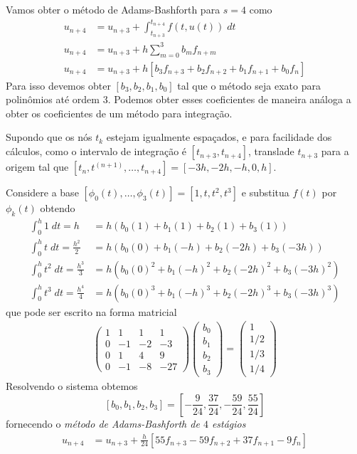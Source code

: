 \begin{ex}
Vamos obter o método de Adams-Bashforth para $s=4$ como
\begin{eqnarray}
  u_{n+4}  &= u_{n+3}  + \int _{t_{n+3}}^{t_{n+4}} f(t,u(t)) \; dt \\
  u_{n+4}  &= u_{n+3}  + h \sum_{m=0}^{3} b_m f_{n+m} \\
  u_{n+4}  &= u_{n+3}  + h [b_3f_{n+3} +b_2f_{n+2} +b_1f_{n+1} +b_0f_n]
\end{eqnarray}
Para isso devemos obter $[b_3,b_2,b_1,b_0]$ tal que o método seja exato para polinômios até ordem $3$. Podemos obter esses coeficientes de maneira análoga a obter os coeficientes de um método para integração.

Supondo que os nós $t_k$ estejam igualmente espaçados, e para facilidade dos cálculos, como o intervalo de integração é $[t_{n+3},t_{n+4}]$, translade $t_{n+3}$ para a origem tal que $[t_n,t^{(n+1)},\ldots ,t_{n+4}]=[-3h,-2h,-h,0,h]$.

Considere a base $[\phi _0(t),\ldots ,\phi _3(t)]=[1, t, t^2, t^3]$ e substitua $f(t)$ por $\phi _k(t)$ obtendo
\begin{eqnarray*}
  \int _0^{h} 1  \;dt = h             &= h( b_0(1)  +b_1(1)    + b_2(1)   + b_3(1)    )\\
  \int _0^{h} t  \;dt = \frac{h^2}{2}  &= h( b_0(0)  +b_1(-h)   + b_2(-2h) + b_3(-3h)  )\\
  \int _0^{h} t^2 \;dt = \frac{h^3}{3}  &= h( b_0(0)^2 +b_1(-h)^2  + b_2(-2h)^2+ b_3(-3h)^2 )\\
  \int _0^{h} t^3 \;dt = \frac{h^4}{4} &= h( b_0(0)^3 +b_1(-h)^3  + b_2(-2h)^3+ b_3(-3h)^3 )
\end{eqnarray*}
que pode ser escrito na forma matricial
\begin{eqnarray}
\left(
  \begin{array}{cccc}
    1  &  1    & 1   & 1\\
    0  &  -1   & -2  & -3\\
    0  &  1    & 4   &  9\\
    0  &  -1   & -8  & -27
  \end{array}
\right)
\left(\begin{array}{c}  b_0 \\ b_1\\ b_2\\b_3   \end{array}\right)
=
\left(\begin{array}{c}  1  \\ 1/2 \\ 1/3 \\ 1/4  \end{array}\right)
\end{eqnarray}
Resolvendo o sistema obtemos
$$[b_0,b_1,b_2,b_3]=[-\frac{9}{24},\frac{37}{24},-\frac{59}{24},\frac{55}{24}]$$
fornecendo o \emph{método de Adams-Bashforth de $4$ estágios}
\begin{eqnarray}\label{AB4}
  u_{n+4}  &= u_{n+3}  + \frac{h}{24} [55 f_{n+3} -59f_{n+2} +37f_{n+1} -9f_n]
\end{eqnarray}
\end{ex}

